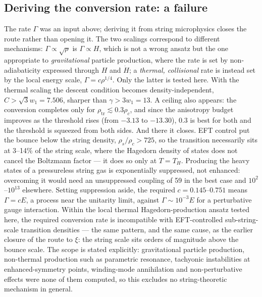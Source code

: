 \documentclass[a4paper,11pt]{article}
\begin{document}
\subsection{Deriving the conversion rate: a failure}
 The rate $\Gamma$ was an input above; deriving it from string microphysics closes the route rather than opening it. The two scalings correspond to different mechanisms: $\Gamma\propto\sqrt\rho$ is $\Gamma\propto H$, which is not a wrong ansatz but the one appropriate to \emph{gravitational} particle production, where the rate is set by non-adiabaticity expressed through $H$ and $\dot H$; a \emph{thermal, collisional} rate is instead set by the local energy scale, $\Gamma=c\rho^{1/4}$. Only the latter is tested here. With the thermal scaling the descent condition becomes density-independent, $C>\sqrt3 w_1=7.506$, sharper than $\gamma>3w_1=13$. A ceiling also appears: the conversion completes only for $\rho_{\mathrm{tr}}\lesssim0.3\rho_c$, and since the anisotropy budget improves as the threshold rises (from $-3.13$ to $-13.30$), $0.3$ is best for both and the threshold is squeezed from both sides. And there it closes. EFT control put the bounce below the string density, $\rho_s/\rho_c>725$, so the transition necessarily sits at 3--14\% of the string scale, where the Hagedorn density of states does not cancel the Boltzmann factor --- it does so only at $T=T_H$. Producing the heavy states of a pressureless string gas is exponentially suppressed, not enhanced: overcoming it would need an unsuppressed coupling of 59 in the best case and $10^2$--$10^{13}$ elsewhere. Setting suppression aside, the required $c=0.145$--$0.751$ means $\Gamma=cE$, a process near the unitarity limit, against $\Gamma\sim10^{-3}E$ for a perturbative gauge interaction. Within the local thermal Hagedorn-production ansatz tested here, the required conversion rate is incompatible with EFT-controlled sub-string-scale transition densities --- the same pattern, and the same cause, as the earlier closure of the route to $\xi$: the string scale sits orders of magnitude above the bounce scale. The scope is stated explicitly: gravitational particle production, non-thermal production such as parametric resonance, tachyonic instabilities at enhanced-symmetry points, winding-mode annihilation and non-perturbative effects were none of them computed, so this excludes no string-theoretic mechanism in general.
\end{document}
